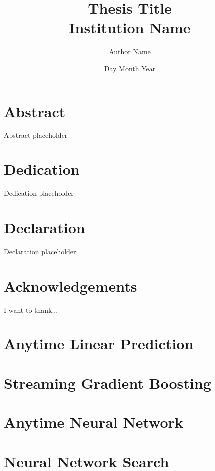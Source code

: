 \documentclass[12pt]{report}
\title{
{Thesis Title}\\
{\large Institution Name}
}
\author{Author Name}
\date{Day Month Year}
\newcommand{\GOMPDIR}{1_gomp}
\newcommand{\SGBDIR}{2_sgb}
\newcommand{\ANNDIR}{3_ann}
\newcommand{\NASDIR}{4_nas}
\begin{document}
\maketitle


\chapter*{Abstract}
Abstract placeholder
 
\chapter*{Dedication}
Dedication placeholder
 
\chapter*{Declaration}
Declaration placeholder
 
\chapter*{Acknowledgements}
I want to thank...
 
\tableofcontents

\linenumbers
\chapter{Anytime Linear Prediction}


\chapter{Streaming Gradient Boosting}


\chapter{Anytime Neural Network}


\chapter{Neural Network Search}











\end{document}
